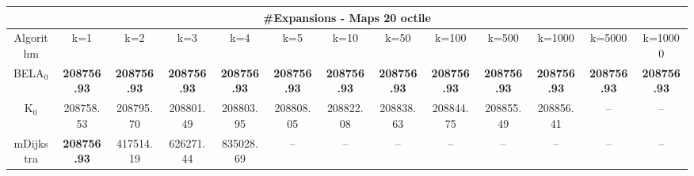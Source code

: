 \begin{tabular}{c|cccccccccccc}\toprule
\multicolumn{13}{c}{#Expansions - Maps 20 octile}\\ \midrule
Algorithm & k=1 & k=2 & k=3 & k=4 & k=5 & k=10 & k=50 & k=100 & k=500 & k=1000 & k=5000 & k=10000 \\ \midrule
BELA$_0$ & \textbf{208756.93} & \textbf{208756.93} & \textbf{208756.93} & \textbf{208756.93} & \textbf{208756.93} & \textbf{208756.93} & \textbf{208756.93} & \textbf{208756.93} & \textbf{208756.93} & \textbf{208756.93} & \textbf{208756.93} & \textbf{208756.93} \\
K$_0$ & 208758.53 & 208795.70 & 208801.49 & 208803.95 & 208808.05 & 208822.08 & 208838.63 & 208844.75 & 208855.49 & 208856.41 & -- & -- \\
mDijkstra & \textbf{208756.93} & 417514.19 & 626271.44 & 835028.69 & -- & -- & -- & -- & -- & -- & -- & -- \\ \bottomrule 
\end{tabular}

